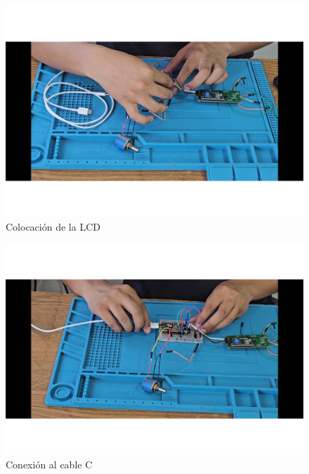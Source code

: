     
    \begin{figure}[H]
        \centering
        \includegraphics[trim =  {25mm 25mm 25mm 10mm},clip,scale=0.3]{22/Img/e8.pdf}
        \caption{Colocación de la LCD}
        \label{fig:evi3}
    \end{figure}
    
    
    \begin{figure}[H]
        \centering
        \includegraphics[trim = {25mm 25mm 25mm 10mm},clip,scale=0.3]{22/Img/e10.pdf}
        \caption{Conexión al cable C}
        \label{fig:evi4}
    \end{figure}
    
